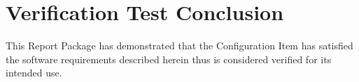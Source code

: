 \newpage
\section{Verification Test Conclusion}
This Report Package has demonstrated that the Configuration Item has satisfied
the software requirements described herein thus is considered verified for its
intended use.
